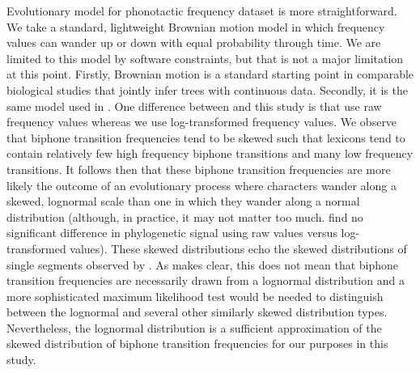 \documentclass[]{article}
\begin{document}
Evolutionary model for phonotactic frequency dataset is more straightforward. We take a standard, lightweight Brownian motion model in which frequency values can wander up or down with equal probability through time. We are limited to this model by software constraints, but that is not a major limitation at this point. Firstly, Brownian motion is a standard starting point in comparable biological studies that jointly infer trees with continuous data. Secondly, it is the same model used in \textcite{macklin-cordes_phylogenetic_2020}. One difference between \textcite{macklin-cordes_phylogenetic_2020} and this study is that \textcite{macklin-cordes_phylogenetic_2020} use raw frequency values whereas we use log-transformed frequency values. We observe that biphone transition frequencies tend to be skewed such that lexicons tend to contain relatively few high frequency biphone transitions and many low frequency transitions. It follows then that these biphone transition frequencies are more likely the outcome of an evolutionary process where characters wander along a skewed, lognormal scale than one in which they wander along a normal distribution (although, in practice, it may not matter too much. \textcite{macklin-cordes_phylogenetic_2020} find no significant difference in phylogenetic signal using raw values versus log-transformed values). These skewed distributions echo the skewed distributions of single segments observed by \textcite{macklin-cordes_re-evaluating_2020}. As \textcite{macklin-cordes_re-evaluating_2020} makes clear, this does not mean that biphone transition frequencies are necessarily drawn from a lognormal distribution and a more sophisticated maximum likelihood test would be needed to distinguish between the lognormal and several other similarly skewed distribution types. Nevertheless, the lognormal distribution is a sufficient approximation of the skewed distribution of biphone transition frequencies for our purposes in this study.
\end{document}
